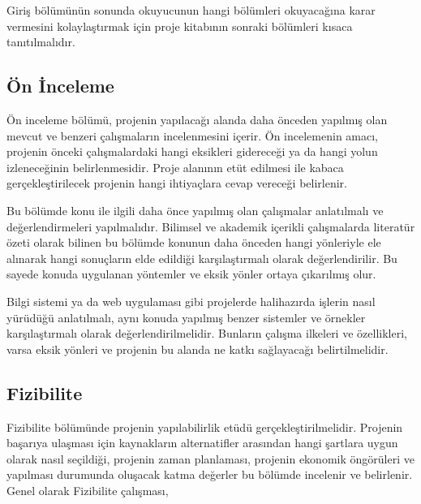 Giriş bölümünün sonunda okuyucunun hangi bölümleri okuyacağına karar vermesini kolaylaştırmak için proje kitabının sonraki bölümleri kısaca tanıtılmalıdır.

\subsection{Ön İnceleme} 
Ön inceleme bölümü, projenin yapılacağı alanda daha önceden yapılmış olan mevcut ve benzeri çalışmaların incelenmesini içerir. Ön incelemenin amacı, projenin önceki çalışmalardaki hangi eksikleri gidereceği ya da hangi yolun izleneceğinin belirlenmesidir. Proje alanının etüt edilmesi ile kabaca gerçekleştirilecek projenin hangi ihtiyaçlara cevap vereceği belirlenir.
    
Bu bölümde konu ile ilgili daha önce yapılmış olan çalışmalar anlatılmalı ve değerlendirmeleri yapılmalıdır. Bilimsel ve akademik içerikli çalışmalarda literatür özeti olarak bilinen bu bölümde konunun daha önceden hangi yönleriyle ele alınarak hangi sonuçların elde edildiği karşılaştırmalı olarak değerlendirilir. Bu sayede konuda uygulanan yöntemler ve eksik yönler ortaya çıkarılmış olur.

Bilgi sistemi ya da web uygulaması gibi projelerde halihazırda işlerin nasıl yürüdüğü anlatılmalı, aynı konuda yapılmış benzer sistemler ve örnekler karşılaştırmalı olarak değerlendirilmelidir. Bunların çalışma ilkeleri ve özellikleri, varsa eksik yönleri ve projenin bu alanda ne katkı sağlayacağı belirtilmelidir.

\subsection{Fizibilite} 
Fizibilite bölümünde projenin yapılabilirlik etüdü gerçekleştirilmelidir. Projenin başarıya ulaşması için kaynakların alternatifler arasından hangi şartlara uygun olarak nasıl seçildiği, projenin zaman planlaması, projenin ekonomik öngörüleri ve yapılması durumunda oluşacak katma değerler bu bölümde incelenir ve belirlenir. Genel olarak Fizibilite çalışması,
    
